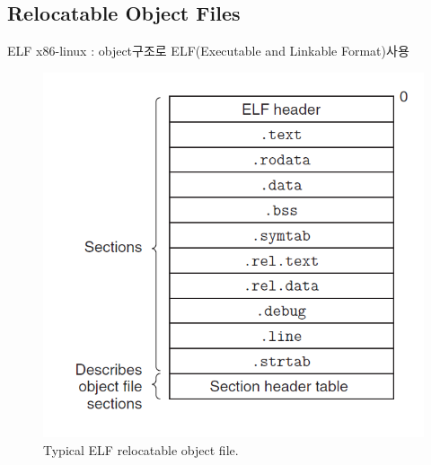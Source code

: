 \documentclass[10pt]{beamer}
\begin{document}
\subsection{Relocatable Object Files}

\begin{frame}{ELF}
    x86-linux : object구조로 ELF(Executable and Linkable Format)사용
    \begin{figure}[h!]
        \centering
        \includegraphics[scale=0.45]{pic2.PNG}
        \caption{Typical ELF relocatable object file.}
    \end{figure}
\end{frame}    
\end{document}
